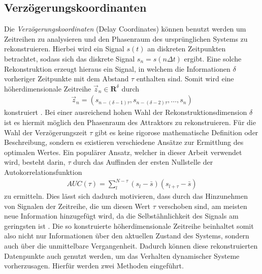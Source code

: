 \subsection{Verzögerungskoordinanten}
\label{sc:delay_reconstruction}
Die \textit{Verzögerungskoordinaten} (Delay Coordinates) können benutzt werden um Zeitreihen zu analysieren und den Phasenraum des ursprünglichen Systems zu rekonstruieren.
Hierbei wird ein Signal $s(t)$ an diskreten Zeitpunkten betrachtet, sodass sich das diskrete Signal $s_n = s(n\Delta t)$ ergibt. Eine solche Rekonstruktion erzeugt hieraus ein Signal, in welchem die Informationen $\delta$ vorheriger Zeitpunkte mit dem Abstand $\tau$ enthalten sind. Somit wird eine höherdimensionale Zeitreihe $\vec{z}_n \in \mathbf{R}^{\delta}$ durch
\begin{align}
	\vec{z}_n = \left(s_{n-(\delta-1)\tau}, s_{n-(\delta-2)\tau}, \ldots ,s_n \right)
\end{align} 
konstruiert \citep[35\,ff.]{kantz2004nonlinear}. Bei einer ausreichend hohen Wahl der Rekonstruktionsdimension $\delta$ ist es hiermit möglich den Phasenraum des Attraktors zu rekonstruieren. Für die Wahl der Verzögerungszeit $\tau$ gibt es keine rigorose mathematische Definition oder Beschreibung, sondern es existieren verschiedene Ansätze zur Ermittlung des optimalen Wertes. Ein populärer Ansatz, welcher in dieser Arbeit verwendet wird, besteht darin, $\tau$ durch das Auffinden der ersten Nullstelle der Autokorrelationsfunktion 
\begin{align}
AUC(\tau) = \sum_l^{N-\tau} (s_l-\bar{s})(s_{l+\tau}-\bar{s})
\end{align}   
zu ermitteln. Dies lässt sich dadurch motivieren, dass durch das Hinzunehmen von Signalen der Zeitreihe, die um diesen Wert $\tau$ verschoben sind, am meisten neue Information hinzugefügt wird, da die Selbstähnlichkeit des Signals am geringsten ist \citep[30\,ff.]{kantz2004nonlinear}.
Die so konstruierte höherdimensionale Zeitreihe beinhaltet somit also nicht nur Informationen über den aktuellen Zustand des Systems, sondern auch über die unmittelbare Vergangenheit. Dadurch können diese rekonstruierten Datenpunkte auch genutzt werden, um das Verhalten dynamischer Systeme vorherzusagen. Hierfür werden zwei Methoden eingeführt.